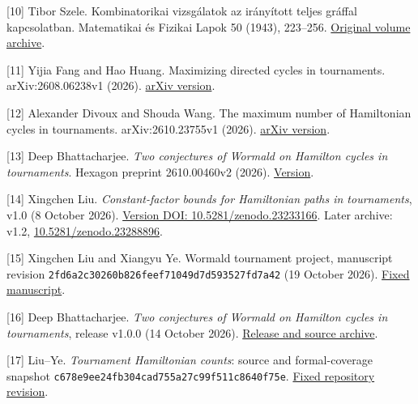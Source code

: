 \documentclass[11pt,a4paper]{article}
\begin{document}
{[}10{]} Tibor Szele. Kombinatorikai vizsgálatok az irányított teljes gráffal kapcsolatban. Matematikai és Fizikai Lapok 50 (1943), 223--256. \href{https://real-j.mtak.hu/7300/}{Original volume archive}.

{[}11{]} Yijia Fang and Hao Huang. Maximizing directed cycles in tournaments. arXiv:2608.06238v1 (2026). \href{https://arxiv.org/html/2608.06238v1\#S3}{arXiv version}.

{[}12{]} Alexander Divoux and Shouda Wang. The maximum number of Hamiltonian cycles in tournaments. arXiv:2610.23755v1 (2026). \href{https://arxiv.org/html/2610.23755v1}{arXiv version}.

{[}13{]} Deep Bhattacharjee. \emph{Two conjectures of Wormald on Hamilton cycles in tournaments}. Hexagon preprint 2610.00460v2 (2026). \href{https://hexagonmath.org/2610.00460v2}{Version}.

{[}14{]} Xingchen Liu. \emph{Constant-factor bounds for Hamiltonian paths in tournaments}, v1.0 (8 October 2026). \href{https://doi.org/10.5281/zenodo.23233166}{Version DOI: 10.5281/zenodo.23233166}. Later archive: v1.2, \href{https://doi.org/10.5281/zenodo.23288896}{10.5281/zenodo.23288896}.

{[}15{]} Xingchen Liu and Xiangyu Ye. Wormald tournament project, manuscript revision \nolinkurl{2fd6a2c30260b826feef71049d7d593527fd7a42} (19 October 2026). \href{https://github.com/LStar404/wormald-tournament-conjectures/blob/2fd6a2c30260b826feef71049d7d593527fd7a42/docs/paper.zh.md}{Fixed manuscript}.

{[}16{]} Deep Bhattacharjee. \emph{Two conjectures of Wormald on Hamilton cycles in tournaments}, release v1.0.0 (14 October 2026). \href{https://github.com/creelie/Breakthrough-problems-1/releases/tag/v1.0.0}{Release and source archive}.

{[}17{]} Liu--Ye. \emph{Tournament Hamiltonian counts}: source and formal-coverage snapshot \nolinkurl{c678e9ee24fb304cad755a27c99f511c8640f75e}. \href{https://github.com/LStar404/tournament-hamiltonian-counts-20261028/tree/c678e9ee24fb304cad755a27c99f511c8640f75e}{Fixed repository revision}.
\end{document}
